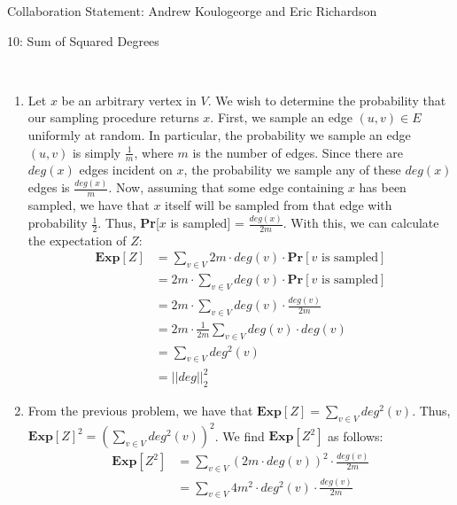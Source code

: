 \documentclass[12pt]{article}
\begin{document}

Collaboration Statement: Andrew Koulogeorge and Eric Richardson 

\begin{problem}{10: Sum of Squared Degrees}

\end{problem}
\begin{solution} \ \\

\begin{enumerate}[label=(\alph*)]
    \item Let $x$ be an arbitrary vertex in $V$. We wish to determine the probability that our sampling procedure returns $x$. First, we sample an edge $(u, v) \in E$ uniformly at random. In particular, the probability we sample an edge $(u, v)$ is simply $\frac{1}{m}$, where $m$ is the number of edges. Since there are $deg(x)$ edges incident on $x$, the probability we sample any of these $deg(x)$ edges is $\frac{deg(x)}{m}$. Now, assuming that some edge containing $x$ has been sampled, we have that $x$ itself will be sampled from that edge with probability $\frac{1}{2}$. Thus, \textbf{Pr}[$x$ is sampled] = $\frac{deg(x)}{2m}$. With this, we can calculate the expectation of $Z$:
    \begin{align*}
        \textbf{Exp}[Z] &= \sum\limits_{v \in V} 2m \cdot deg(v) \cdot \textbf{Pr}[v \text{ is sampled}] \\
        &= 2m \cdot \sum\limits_{v \in V} deg(v) \cdot \textbf{Pr}[v \text{ is sampled}] \\
        &= 2m \cdot \sum\limits_{v \in V} deg(v) \cdot \frac{deg(v)}{2m} \\
        &= 2m \cdot \frac{1}{2m} \sum\limits_{v \in V} deg(v) \cdot deg(v) \\
        &= \sum\limits_{v \in V} deg^2(v) \\
        &= ||deg||_2^2
    \end{align*}
     \item From the previous problem, we have that $\textbf{Exp}[Z] = \sum\limits_{v \in V} deg^2(v)$. Thus, $\textbf{Exp}[Z]^2 = \left(\sum\limits_{v \in V}deg^2(v)\right)^2$. We find $\textbf{Exp}[Z^2]$ as follows:
    \begin{align*}
        \textbf{Exp}[Z^2] &= \sum\limits_{v \in V} \left(2m \cdot deg(v)\right)^2 \cdot \frac{deg(v)}{2m} \\
        &= \sum\limits_{v \in V} 4m^2 \cdot deg^2(v) \cdot \frac{deg(v)}{2m} \\

\end{align*}
\end{enumerate}
\end{solution}
\end{document}

